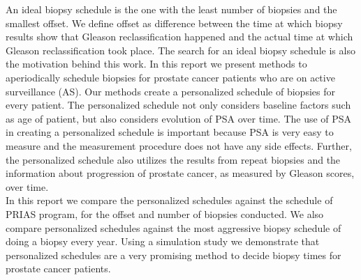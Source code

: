 An ideal biopsy schedule is the one with the least number of biopsies and the smallest offset. We define offset as difference between the time at which biopsy results show that Gleason reclassification happened and the actual time at which Gleason reclassification took place. The search for an ideal biopsy schedule is also the motivation behind this work. In this report we present methods to aperiodically schedule biopsies for prostate cancer patients who are on active surveillance (AS). Our methods create a personalized schedule of biopsies for every patient. The personalized schedule not only considers baseline factors such as age of patient, but also considers evolution of PSA over time. The use of PSA in creating a personalized schedule is important because PSA is very easy to measure and the measurement procedure does not have any side effects. Further, the personalized schedule also utilizes the results from repeat biopsies and the information about progression of prostate cancer, as measured by Gleason scores, over time.\\

In this report we compare the personalized schedules against the schedule of PRIAS program, for the offset and number of biopsies conducted. We also compare personalized schedules against the most aggressive biopsy schedule of doing a biopsy every year. Using a simulation study we demonstrate that personalized schedules are a very promising method to decide biopsy times for prostate cancer patients.
